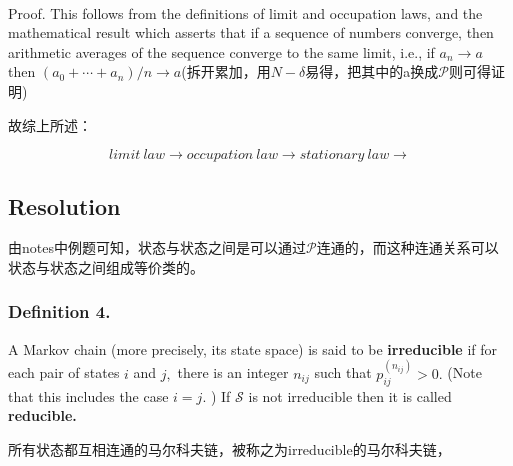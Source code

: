 \documentclass[UTF8]{ctexart}
\begin{document}
\

Proof. This follows from the definitions of limit and occupation laws, and the mathematical result which asserts that if a sequence of numbers converge, then arithmetic averages of the sequence converge to the same limit, i.e., if $a_{n} \rightarrow a$ then $\left(a_{0}+\cdots+a_{n}\right) / n \rightarrow a$(拆开累加，用$N - \delta$易得，把其中的a换成$\mathcal{P}$则可得证明)

故综上所述：

$$limit\ law\to occupation\ law \to stationary\ law \to  $$

\subsection{Resolution}

由notes中例题可知，状态与状态之间是可以通过$\mathcal{P}$连通的，而这种连通关系可以状态与状态之间组成等价类的。
\subsubsection{Definition 4.} A Markov chain (more precisely, its state space) is said to be \textbf{irreducible} if for each pair of states $i$ and $j,$ there is an integer $n_{i j}$ such that $p_{i j}^{\left(n_{i j}\right)}>0 .$ (Note that this includes the case $i=j .$ ) If $\mathcal{S}$ is not irreducible then it is called \textbf{reducible.}

所有状态都互相连通的马尔科夫链，被称之为irreducible的马尔科夫链，
\end{document}
